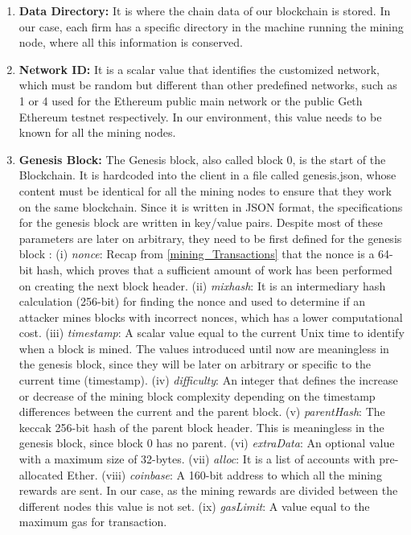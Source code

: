 \begin{enumerate}
	
	\item \textbf{Data Directory:} It is where the chain data of our blockchain is stored. In our case, each firm has a specific directory in the machine running the mining node, where all this information is conserved.
	\item \textbf{Network ID:} It is a scalar value that identifies the customized network, which must be random but different than other predefined networks, such as 1 or 4 used for the Ethereum public main network or the public Geth Ethereum testnet respectively. In our environment, this value needs to be known for all the mining nodes.
	\item \textbf{Genesis Block:} The Genesis block, also called block 0, is the start of the Blockchain. It is hardcoded into the client in a file called genesis.json, whose content must be identical for all the mining nodes to ensure that they work on the same blockchain. Since it is written in JSON format, the specifications for the genesis block are written in key/value pairs. Despite most of these parameters are later on arbitrary, they need to be first defined for the genesis block \citep{GenesisParams}: (i) \textit{nonce}: Recap from \ref{mining_Transactions} that the nonce is a 64-bit hash, which proves that a sufficient amount of work has been performed on creating the next block header. (ii) \textit{mixhash}: It is an intermediary hash calculation (256-bit) for finding the nonce and used to determine if an attacker mines blocks with incorrect nonces, which has a lower computational cost. (iii) \textit{timestamp}: A scalar value equal to the current Unix time to identify when a block is mined. The values introduced until now are meaningless in the genesis block, since they will be later on arbitrary or specific to the current time (timestamp). (iv) \textit{difficulty}: An integer that defines the increase or decrease of the mining block complexity depending on the timestamp differences between the current and the parent block. (v) \textit{parentHash}: The keccak 256-bit hash of the parent block header. This is meaningless in the genesis block, since block 0 has no parent. (vi) \textit{extraData}: An optional value with a maximum size of 32-bytes. (vii) \textit{alloc}: It is a list of accounts with pre-allocated Ether. (viii) \textit{coinbase}: A 160-bit address to which all the mining rewards are sent. In our case, as the mining rewards are divided between the different nodes this value is not set. (ix) \textit{gasLimit}: A value equal to the maximum gas for transaction.

\end{enumerate}

